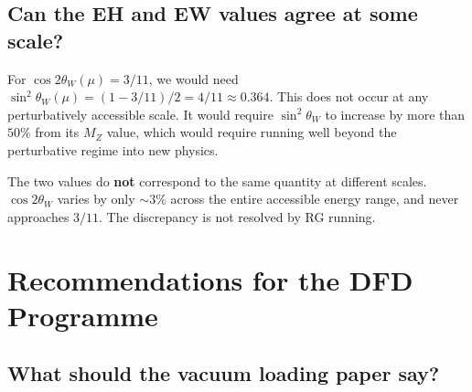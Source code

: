 \documentclass[11pt,a4paper]{article}
\begin{document}
\subsection{Can the EH and EW values agree at some scale?}

For $\cos 2\theta_W(\mu) = 3/11$, we would need $\sin^2\theta_W(\mu)
= (1 - 3/11)/2 = 4/11 \approx 0.364$.  This does not occur at any
perturbatively accessible scale.  It would require $\sin^2\theta_W$ to
increase by more than $50\%$ from its $M_Z$ value, which would require
running well beyond the perturbative regime into new physics.

\begin{tcolorbox}[colback=blue!5!white, colframe=blue!50!black,
title=Verdict on Running]
The two values do \textbf{not} correspond to the same quantity at different
scales.  $\cos 2\theta_W$ varies by only $\sim 3\%$ across the entire
accessible energy range, and never approaches $3/11$.  The discrepancy
is not resolved by RG running.
\end{tcolorbox}

\section{Recommendations for the DFD Programme}
\label{sec:recommendations}

\subsection{What should the vacuum loading paper say?}
\end{document}
